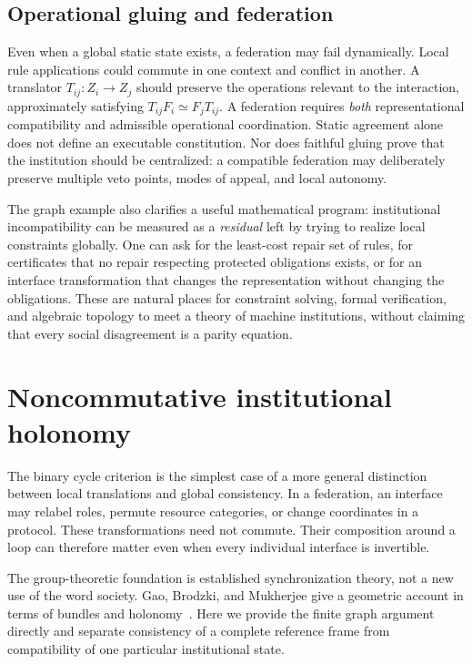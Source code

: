 \documentclass[11pt,letterpaper]{article}
\theoremstyle{plain}
\theoremstyle{definition}
\theoremstyle{remark}
\begin{document}
\subsection{Operational gluing and federation}

Even when a global static state exists, a federation may fail dynamically. Local rule applications could commute in one context and conflict in another. A translator $T_{ij}:Z_i\to Z_j$ should preserve the operations relevant to the interaction, approximately satisfying $T_{ij}F_i\simeq F_jT_{ij}$. A federation requires \emph{both} representational compatibility and admissible operational coordination. Static agreement alone does not define an executable constitution. Nor does faithful gluing prove that the institution should be centralized: a compatible federation may deliberately preserve multiple veto points, modes of appeal, and local autonomy.

The graph example also clarifies a useful mathematical program: institutional incompatibility can be measured as a \emph{residual} left by trying to realize local constraints globally. One can ask for the least-cost repair set of rules, for certificates that no repair respecting protected obligations exists, or for an interface transformation that changes the representation without changing the obligations. These are natural places for constraint solving, formal verification, and algebraic topology to meet a theory of machine institutions, without claiming that every social disagreement is a parity equation.


\section{Noncommutative institutional holonomy}\label{sec:holonomy}
The binary cycle criterion is the simplest case of a more general distinction between local translations and global consistency. In a federation, an interface may relabel roles, permute resource categories, or change coordinates in a protocol. These transformations need not commute. Their composition around a loop can therefore matter even when every individual interface is invertible.

The group-theoretic foundation is established synchronization theory, not a new use of the word society. Gao, Brodzki, and Mukherjee give a geometric account in terms of bundles and holonomy~\cite{gaosync}. Here we provide the finite graph argument directly and separate consistency of a complete reference frame from compatibility of one particular institutional state.
\end{document}
